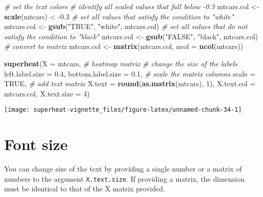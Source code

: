 \documentclass[]{book}
\newenvironment{Shaded}{\begin{snugshade}}{\end{snugshade}}
\newcommand{\KeywordTok}[1]{\textcolor[rgb]{0.13,0.29,0.53}{\textbf{{#1}}}}
\newcommand{\DataTypeTok}[1]{\textcolor[rgb]{0.13,0.29,0.53}{{#1}}}
\newcommand{\DecValTok}[1]{\textcolor[rgb]{0.00,0.00,0.81}{{#1}}}
\newcommand{\FloatTok}[1]{\textcolor[rgb]{0.00,0.00,0.81}{{#1}}}
\newcommand{\StringTok}[1]{\textcolor[rgb]{0.31,0.60,0.02}{{#1}}}
\newcommand{\CommentTok}[1]{\textcolor[rgb]{0.56,0.35,0.01}{\textit{{#1}}}}
\newcommand{\OtherTok}[1]{\textcolor[rgb]{0.56,0.35,0.01}{{#1}}}
\newcommand{\NormalTok}[1]{{#1}}
\theoremstyle{definition}
\theoremstyle{definition}
\theoremstyle{remark}
\begin{document}
\begin{Shaded}
\begin{Highlighting}[]
\CommentTok{# set the text colors }
\CommentTok{# identify all scaled values that fall below -0.3}
\NormalTok{mtcars.col <-}\StringTok{ }\KeywordTok{scale}\NormalTok{(mtcars) <}\StringTok{ }\NormalTok{-}\FloatTok{0.3}
\CommentTok{# set all values that satisfy the condition to "white"}
\NormalTok{mtcars.col <-}\StringTok{ }\KeywordTok{gsub}\NormalTok{(}\StringTok{"TRUE"}\NormalTok{, }\StringTok{"white"}\NormalTok{, mtcars.col)}
\CommentTok{# set all values that do not satisfy the condition to "black"}
\NormalTok{mtcars.col <-}\StringTok{ }\KeywordTok{gsub}\NormalTok{(}\StringTok{"FALSE"}\NormalTok{, }\StringTok{"black"}\NormalTok{, mtcars.col)}
\CommentTok{# convert to matrix}
\NormalTok{mtcars.col <-}\StringTok{ }\KeywordTok{matrix}\NormalTok{(mtcars.col, }\DataTypeTok{ncol =} \KeywordTok{ncol}\NormalTok{(mtcars))}

\KeywordTok{superheat}\NormalTok{(}\DataTypeTok{X =} \NormalTok{mtcars, }\CommentTok{# heatmap matrix}
          \CommentTok{# change the size of the labels}
          \DataTypeTok{left.label.size =} \FloatTok{0.4}\NormalTok{,}
          \DataTypeTok{bottom.label.size =} \FloatTok{0.1}\NormalTok{,}
          \CommentTok{# scale the matrix columns}
          \DataTypeTok{scale =} \OtherTok{TRUE}\NormalTok{,}
          \CommentTok{# add text matrix}
          \DataTypeTok{X.text =} \KeywordTok{round}\NormalTok{(}\KeywordTok{as.matrix}\NormalTok{(mtcars), }\DecValTok{1}\NormalTok{),}
          \DataTypeTok{X.text.col =} \NormalTok{mtcars.col,}
          \DataTypeTok{X.text.size =} \DecValTok{4}\NormalTok{)}
\end{Highlighting}
\end{Shaded}

\begin{center}\texttt{[image: superheat-vignette\_files/figure-latex/unnamed-chunk-34-1]} \end{center}

\section{Font size}\label{font-size}

You can change size of the text by providing a single number or a matrix
of numbers to the argument \texttt{X.text.size}. If providing a matrix,
the dimension must be identical to that of the X matrix provided.
\end{document}
